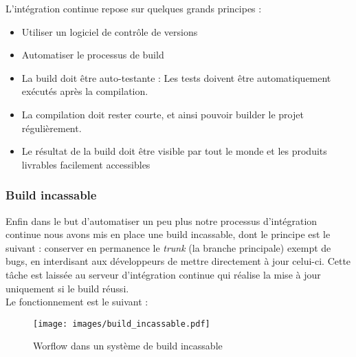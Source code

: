 L'intégration continue repose sur quelques grands principes :
\begin{itemize}
	\item Utiliser un logiciel de contrôle de versions
	\item Automatiser le processus de build
	\item La build doit être \og auto-testante \fg{} : Les tests doivent être automatiquement exécutés après la compilation.
	\item La compilation doit rester courte, et ainsi pouvoir builder le projet régulièrement.
	\item Le résultat de la build doit être visible par tout le monde et les produits livrables facilement accessibles\\
\end{itemize}


\subsubsection{Build incassable}

Enfin dans le but d'automatiser un peu plus notre processus d'intégration continue nous avons mis en place une build incassable, dont le principe est le suivant : conserver en permanence le \textit{trunk} (la branche principale) exempt de bugs, en interdisant aux développeurs de mettre directement à jour celui-ci. Cette tâche est laissée au serveur d'intégration continue qui réalise la mise à jour uniquement si le build réussi.\\

Le fonctionnement est le suivant :\\
\begin{figure}
	\centering
		\texttt{[image: images/build\_incassable.pdf]}
	\caption{Worflow dans un système de build incassable}
\end{figure}

